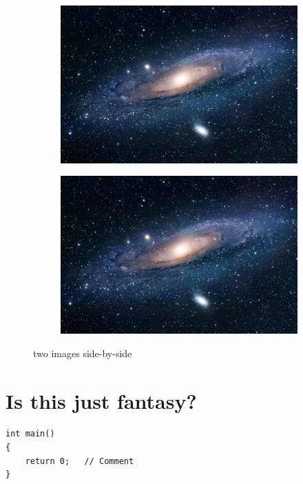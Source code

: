 \begin{figure}[h]
    \begin{subfigure}{0.45\textwidth}
    \includegraphics[width=1\linewidth]{res/sample-image.jpeg} 
    \label{fig:serial-solution}
    
\end{subfigure}
    \begin{subfigure}{0.45\textwidth}
    \includegraphics[width=1\linewidth]{res/sample-image.jpeg}
    \label{fig:parallel-solution}
\end{subfigure}

\caption{two images side-by-side}
\label{fig:serial-vs-parallel}
\end{figure}

\section{Is this just fantasy?}




\begin{minipage}{\linewidth}
\begin{lstlisting}[caption=Sample Algorithm]
int main()
{
    return 0;   // Comment
}
\end{lstlisting}
\end{minipage}






